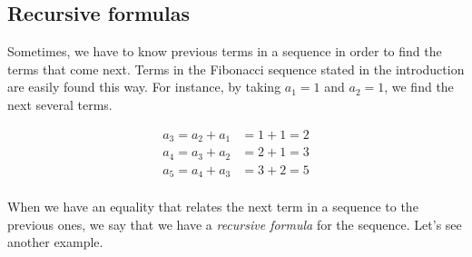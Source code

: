 \documentclass{ximera}
\begin{document}
%
%  



\subsection{Recursive formulas}

Sometimes, we have to know previous terms in a sequence in order to find the terms that come next.  Terms in the Fibonacci sequence stated in the introduction are easily found this way.  For instance, by taking $a_1=1$ and $a_2=1$, we find the next several terms.

\begin{align*}
a_3 = a_2+a_1 & = 1+1=2 \\
a_4 = a_3+a_2 &= 2+1 = 3 \\
a_5 = a_4+a_3 &= 3+2 = 5 \\
\end{align*}

When we have an equality that relates the next term in a sequence to the previous ones, we say that we have a \emph{recursive formula} for the sequence.  Let's see another example.
\end{document}
